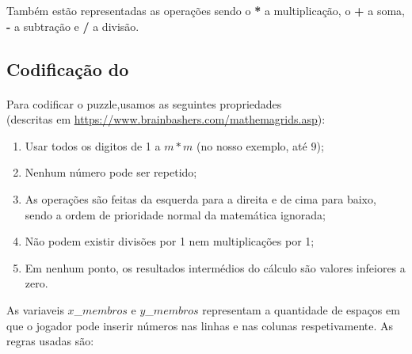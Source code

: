 \documentclass{article}
\begin{document}
Também estão representadas as operações sendo o {\bf{*}} a multiplicação, o  {\bf{+}} a soma, {\bf{-}} a subtração e {\bf{/}} a divisão. 




\subsection{Codificação do {}}
\paragraph{} Para codificar o puzzle,usamos as seguintes propriedades \\
(descritas em {\url{https://www.brainbashers.com/mathemagrids.asp}}):
 \begin{enumerate}
 \item Usar todos os digitos de 1 a $m*m$ (no nosso exemplo, até $9$);
 \item Nenhum número pode ser repetido;
 \item As operações são feitas da esquerda para a direita e de cima para baixo, sendo a ordem de prioridade normal da matemática ignorada;
 \item Não podem existir divisões por 1 nem multiplicações por 1;
\item Em nenhum ponto, os resultados intermédios do cálculo são valores infeiores a zero.
 \end{enumerate}

As variaveis $x$\_$membros$ e $y$\_$membros$ representam a quantidade de espaços em que o jogador pode inserir números nas linhas e nas colunas respetivamente. As regras usadas são:
\end{document}

